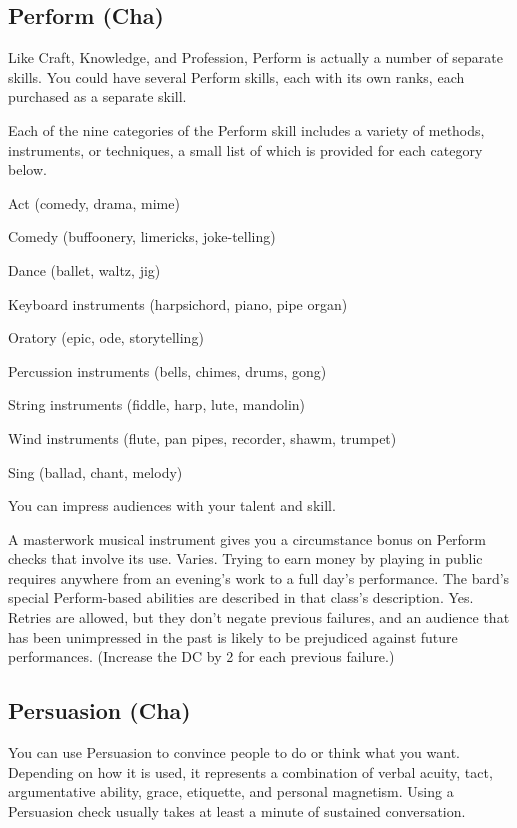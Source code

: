 \subsection{Perform (Cha)}
\par Like Craft, Knowledge, and Profession, Perform is actually a number of separate skills. You could have several Perform skills, each with its own ranks, each purchased as a separate skill.

Each of the nine categories of the Perform skill includes a variety of methods, instruments, or techniques, a small list of which is provided for each category below.
\begin{itemize*}
\item Act (comedy, drama, mime)
\item Comedy (buffoonery, limericks, joke-telling)
\item Dance (ballet, waltz, jig)
\item Keyboard instruments (harpsichord, piano, pipe organ)
\item Oratory (epic, ode, storytelling)
\item Percussion instruments (bells, chimes, drums, gong)
\item String instruments (fiddle, harp, lute, mandolin)
\item Wind instruments (flute, pan pipes, recorder, shawm, trumpet)
\item Sing (ballad, chant, melody)
\end{itemize*}
 You can impress audiences with your talent and skill.
\par A masterwork musical instrument gives you a  circumstance bonus on Perform checks that involve its use.
 Varies. Trying to earn money by playing in public requires anywhere from an evening's work to a full day's performance. The bard's special Perform-based abilities are described in that class's description.
 Yes. Retries are allowed, but they don't negate previous failures, and an audience that has been unimpressed in the past is likely to be prejudiced against future performances. (Increase the DC by 2 for each previous failure.)

\subsection{Persuasion (Cha)}
You can use Persuasion to convince people to do or think what you want. Depending on how it is used, it represents a combination of verbal acuity, tact, argumentative ability, grace, etiquette, and personal magnetism. Using a Persuasion check usually takes at least a minute of sustained conversation.

